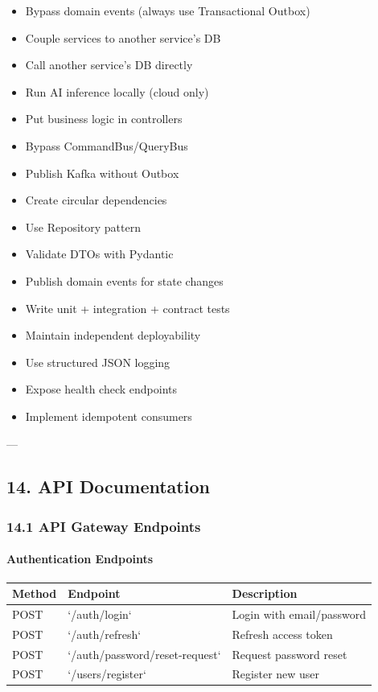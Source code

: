 \documentclass[11pt,a4paper]{article}
\begin{document}
\begin{itemize}
\item Bypass domain events (always use Transactional Outbox)
\item Couple services to another service's DB
\item Call another service's DB directly
\item Run AI inference locally (cloud only)
\item Put business logic in controllers
\item Bypass CommandBus/QueryBus
\item Publish Kafka without Outbox
\item Create circular dependencies
\end{itemize}

\begin{itemize}
\item Use Repository pattern
\item Validate DTOs with Pydantic
\item Publish domain events for state changes
\item Write unit + integration + contract tests
\item Maintain independent deployability
\item Use structured JSON logging
\item Expose health check endpoints
\item Implement idempotent consumers
\end{itemize}

---

\subsection{14. API Documentation}

\subsubsection{14.1 API Gateway Endpoints}


\paragraph{Authentication Endpoints}

\begin{table}[H]
\centering
\begin{tabular}{|l|l|l|}
\hline
Method & Endpoint & Description \\
\hline
POST & `/auth/login` & Login with email/password \\
\hline
POST & `/auth/refresh` & Refresh access token \\
\hline
POST & `/auth/password/reset-request` & Request password reset \\
\hline
POST & `/users/register` & Register new user \\
\hline
\end{tabular}
\end{table}
\end{document}
